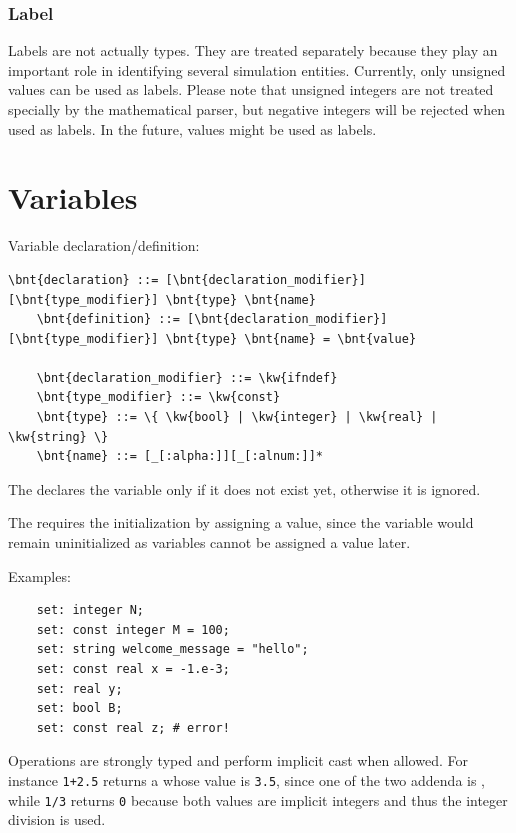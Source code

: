 \subsubsection{Label}
\label{sec:label}
Labels are not actually types.
They are treated separately because they play an important role in identifying several simulation entities.
Currently, only unsigned  values can be used as labels.
Please note that unsigned integers are not treated specially by the mathematical parser,
but negative integers will be rejected when used as labels.
In the future,  values might be used as labels.


\section{Variables}
\label{sec:variables}
Variable declaration/definition:
\begin{Verbatim}[commandchars=\\\{\}]
    \bnt{declaration} ::= [\bnt{declaration_modifier}] [\bnt{type_modifier}] \bnt{type} \bnt{name}
    \bnt{definition} ::= [\bnt{declaration_modifier}] [\bnt{type_modifier}] \bnt{type} \bnt{name} = \bnt{value}

    \bnt{declaration_modifier} ::= \kw{ifndef}
    \bnt{type_modifier} ::= \kw{const}
    \bnt{type} ::= \{ \kw{bool} | \kw{integer} | \kw{real} | \kw{string} \}
    \bnt{name} ::= [_[:alpha:]][_[:alnum:]]*
\end{Verbatim}
The   declares the variable only if it does not exist yet,
otherwise it is ignored.

The   requires the initialization by assigning a value,
since the variable would remain uninitialized as  variables cannot be assigned
a value later.

Examples:
\begin{verbatim}
    set: integer N;
    set: const integer M = 100;
    set: string welcome_message = "hello";
    set: const real x = -1.e-3;
    set: real y;
    set: bool B;
    set: const real z; # error!
\end{verbatim}

Operations are strongly typed and perform implicit cast when allowed.
For instance \texttt{1+2.5} returns a  whose value 
is \texttt{3.5}, since one of the 
two addenda is , while \texttt{1/3} returns \texttt{0} because 
both values are implicit integers and thus the integer division is used.

